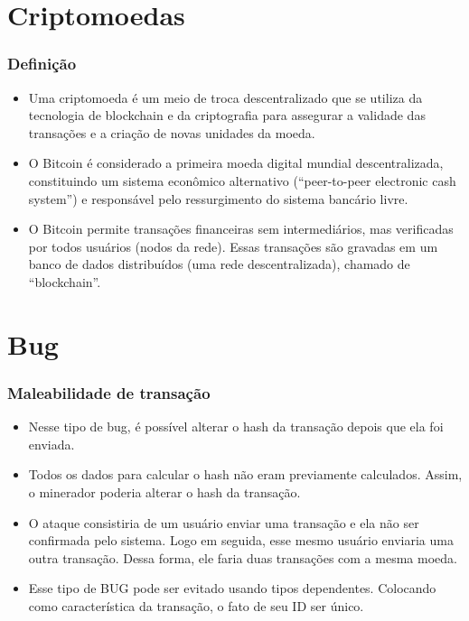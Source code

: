 \documentclass{beamer}
\begin{document}
\section{Criptomoedas}

\begin{frame}
  \frametitle{Definição}
\begin{itemize}
    \item Uma criptomoeda é um meio de troca descentralizado que se utiliza da tecnologia
      de blockchain e da criptografia para assegurar a validade das transações e a criação de novas unidades da moeda.
    \item O Bitcoin é considerado a primeira moeda digital mundial descentralizada,
      constituindo um sistema econômico alternativo (\foreignquote{english}{peer-to-peer electronic cash system})
      e responsável pelo ressurgimento do sistema bancário livre.
      \cite{nakamoto2008bitcoin}
    \item O Bitcoin permite transações financeiras sem intermediários,
      mas verificadas por todos usuários (nodos da rede).
      Essas transações são gravadas em um banco de dados distribuídos (uma rede descentralizada),
      chamado de \foreignquote{english}{blockchain}.
    \end{itemize}
\end{frame}

\section{Bug}

 \begin{frame}
   \frametitle{Maleabilidade de transação}
\begin{itemize}
  \item Nesse tipo de bug, é possível alterar o hash da transação depois que ela foi enviada.
  \item Todos os dados para calcular o hash não eram previamente calculados. Assim, o minerador poderia alterar o hash da transação.
  \item O ataque consistiria de um usuário enviar uma transação e ela não ser confirmada pelo sistema.
    Logo em seguida, esse mesmo usuário enviaria uma outra transação. Dessa forma, ele faria duas transações com a mesma moeda.
  \item Esse tipo de BUG pode ser evitado usando tipos dependentes.
    Colocando como característica da transação, o fato de seu ID ser único.
\end{itemize}
\end{frame}
\end{document}
